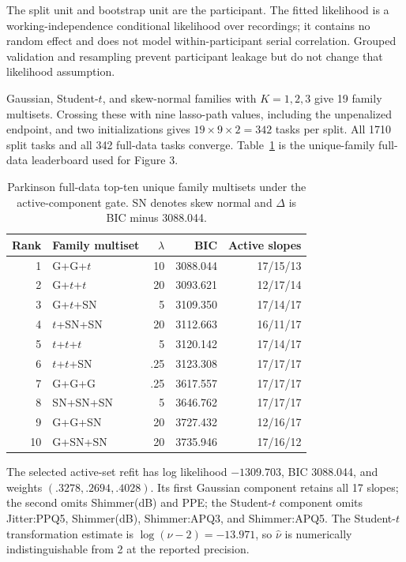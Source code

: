 \documentclass[a4paper,fleqn]{cas-sc}
\numberwithin{equation}{section}
\begin{document}
The split unit and bootstrap unit are the participant. The fitted likelihood is a working-independence conditional likelihood over recordings; it contains no random effect and does not model within-participant serial correlation. Grouped validation and resampling prevent participant leakage but do not change that likelihood assumption.

Gaussian, Student-$t$, and skew-normal families with $K=1,2,3$ give 19 family multisets. Crossing these with nine lasso-path values, including the unpenalized endpoint, and two initializations gives $19\times9\times2=342$ tasks per split. All 1710 split tasks and all 342 full-data tasks converge. Table~\ref{supp:tab:park-leaderboard} is the unique-family full-data leaderboard used for Figure 3.

\begin{table}[t]
\centering
\caption{Parkinson full-data top-ten unique family multisets under the active-component gate. SN denotes skew normal and $\Delta$ is BIC minus 3088.044.}
\label{supp:tab:park-leaderboard}
\small
\begin{tabular}{rlrrr}
\toprule
Rank & Family multiset & $\lambda$ & BIC & Active slopes\\
\midrule
1 & G+G+$t$ & 10 & 3088.044 & 17/15/13\\
2 & G+$t$+$t$ & 20 & 3093.621 & 12/17/14\\
3 & G+$t$+SN & 5 & 3109.350 & 17/14/17\\
4 & $t$+SN+SN & 20 & 3112.663 & 16/11/17\\
5 & $t$+$t$+$t$ & 5 & 3120.142 & 17/14/17\\
6 & $t$+$t$+SN & .25 & 3123.308 & 17/17/17\\
7 & G+G+G & .25 & 3617.557 & 17/17/17\\
8 & SN+SN+SN & 5 & 3646.762 & 17/17/17\\
9 & G+G+SN & 20 & 3727.432 & 12/16/17\\
10 & G+SN+SN & 20 & 3735.946 & 17/16/12\\
\bottomrule
\end{tabular}
\end{table}

The selected active-set refit has log likelihood $-1309.703$, BIC 3088.044, and weights $(.3278,.2694,.4028)$. Its first Gaussian component retains all 17 slopes; the second omits Shimmer(dB) and PPE; the Student-$t$ component omits Jitter:PPQ5, Shimmer(dB), Shimmer:APQ3, and Shimmer:APQ5. The Student-$t$ transformation estimate is $\log(\nu-2)=-13.971$, so $\widehat\nu$ is numerically indistinguishable from 2 at the reported precision.
\end{document}
